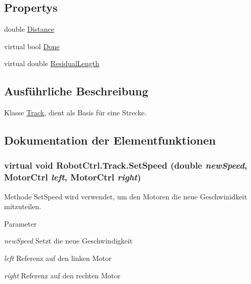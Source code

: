 \subsection*{Propertys}
\begin{DoxyCompactItemize}
\item 
double \hyperlink{class_robot_ctrl_1_1_track_a42bb46c8d3c2a540b1d3d25e65b1a07c}{Distance}
\item 
virtual bool \hyperlink{class_robot_ctrl_1_1_track_ad1c4864f7171475914ef5c0111a0d901}{Done}
\item 
virtual double \hyperlink{class_robot_ctrl_1_1_track_a4f01da358c21733d43ac272d3fb549cc}{ResidualLength}
\end{DoxyCompactItemize}


\subsection{Ausführliche Beschreibung}
Klasse \hyperlink{class_robot_ctrl_1_1_track}{Track}, dient als Basis f\"{u}r eine Strecke. 

\subsection{Dokumentation der Elementfunktionen}
\hypertarget{class_robot_ctrl_1_1_track_a9abc3ccf4bf1d9db8d461f2cb4b4b0d3}{
\subsubsection[{SetSpeed}]{\setlength{\rightskip}{0pt plus 5cm}virtual void RobotCtrl.Track.SetSpeed (double {\em newSpeed}, \/  {\bf MotorCtrl} {\em left}, \/  {\bf MotorCtrl} {\em right})}}
\label{class_robot_ctrl_1_1_track_a9abc3ccf4bf1d9db8d461f2cb4b4b0d3}
Methode SetSpeed wird verwendet, um den Motoren die neue Geschwinidkeit mitzuteilen.


\begin{DoxyParams}{Parameter}
\item[{\em newSpeed}]Setzt die neue Geschwindigkeit \item[{\em left}]Referenz auf den linken Motor \item[{\em right}]Referenz auf den rechten Motor \end{DoxyParams}



